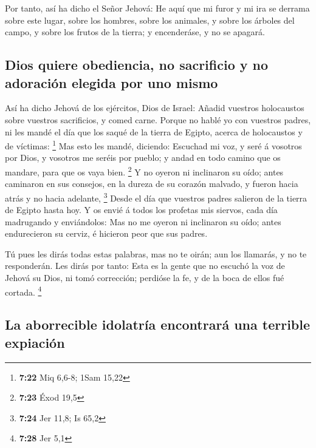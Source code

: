  Por tanto, así ha dicho el Señor Jehová: He aquí que mi
furor y mi ira se derrama sobre este lugar, sobre los hombres, sobre los
animales, y sobre los árboles del campo, y sobre los frutos de la
tierra; y encenderáse, y no se apagará.

\hypertarget{dios-quiere-obediencia-no-sacrificio-y-no-adoraciuxf3n-elegida-por-uno-mismo}{%
\subsection{Dios quiere obediencia, no sacrificio y no adoración elegida
por uno
mismo}\label{dios-quiere-obediencia-no-sacrificio-y-no-adoraciuxf3n-elegida-por-uno-mismo}}

 Así ha dicho Jehová de los ejércitos, Dios de Israel:
Añadid vuestros holocaustos sobre vuestros sacrificios, y comed carne.
 Porque no hablé yo con vuestros padres, ni les mandé el
día que los saqué de la tierra de Egipto, acerca de holocaustos y de
víctimas: \footnote{\textbf{7:22} Miq 6,6-8; 1Sam 15,22} 
Mas esto les mandé, diciendo: Escuchad mi voz, y seré á vosotros por
Dios, y vosotros me seréis por pueblo; y andad en todo camino que os
mandare, para que os vaya bien. \footnote{\textbf{7:23} Éxod 19,5}
 Y no oyeron ni inclinaron su oído; antes caminaron en sus
consejos, en la dureza de su corazón malvado, y fueron hacia atrás y no
hacia adelante, \footnote{\textbf{7:24} Jer 11,8; Is 65,2} 
Desde el día que vuestros padres salieron de la tierra de Egipto hasta
hoy. Y os envié á todos los profetas mis siervos, cada día madrugando y
enviándolos:  Mas no me oyeron ni inclinaron su oído; antes
endurecieron su cerviz, é hicieron peor que sus padres.

 Tú pues les dirás todas estas palabras, mas no te oirán;
aun los llamarás, y no te responderán.  Les dirás por
tanto: Esta es la gente que no escuchó la voz de Jehová su Dios, ni tomó
corrección; perdióse la fe, y de la boca de ellos fué cortada.
\footnote{\textbf{7:28} Jer 5,1}

\hypertarget{la-aborrecible-idolatruxeda-encontraruxe1-una-terrible-expiaciuxf3n}{%
\subsection{La aborrecible idolatría encontrará una terrible
expiación}\label{la-aborrecible-idolatruxeda-encontraruxe1-una-terrible-expiaciuxf3n}}

